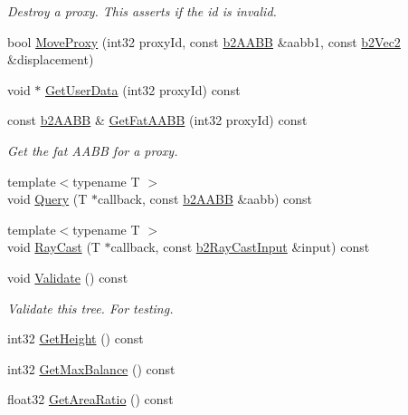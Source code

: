 \begin{DoxyCompactItemize}
\begin{DoxyCompactList}\small\item\em Destroy a proxy. This asserts if the id is invalid. \end{DoxyCompactList}\item 
bool \hyperlink{classb2_dynamic_tree_a7748252811f3c575015931399cbe4daa}{Move\+Proxy} (int32 proxy\+Id, const \hyperlink{structb2_a_a_b_b}{b2\+A\+A\+BB} \&aabb1, const \hyperlink{structb2_vec2}{b2\+Vec2} \&displacement)
\item 
void $\ast$ \hyperlink{classb2_dynamic_tree_a44ab57dce3c42b0a5847a64e489a71ce}{Get\+User\+Data} (int32 proxy\+Id) const 
\item 
const \hyperlink{structb2_a_a_b_b}{b2\+A\+A\+BB} \& \hyperlink{classb2_dynamic_tree_adf4676b1c34a57b4451bcbeaebe65687}{Get\+Fat\+A\+A\+BB} (int32 proxy\+Id) const \hypertarget{classb2_dynamic_tree_adf4676b1c34a57b4451bcbeaebe65687}{}\label{classb2_dynamic_tree_adf4676b1c34a57b4451bcbeaebe65687}

\begin{DoxyCompactList}\small\item\em Get the fat A\+A\+BB for a proxy. \end{DoxyCompactList}\item 
{\footnotesize template$<$typename T $>$ }\\void \hyperlink{classb2_dynamic_tree_adf70aee89b4692fc79d65b1f54308585}{Query} (T $\ast$callback, const \hyperlink{structb2_a_a_b_b}{b2\+A\+A\+BB} \&aabb) const 
\item 
{\footnotesize template$<$typename T $>$ }\\void \hyperlink{classb2_dynamic_tree_abd7a5c6a5bc109dbbdb0ec3aae039648}{Ray\+Cast} (T $\ast$callback, const \hyperlink{structb2_ray_cast_input}{b2\+Ray\+Cast\+Input} \&input) const 
\item 
void \hyperlink{classb2_dynamic_tree_abfac96c615b08406cba3e53b39800f1c}{Validate} () const \hypertarget{classb2_dynamic_tree_abfac96c615b08406cba3e53b39800f1c}{}\label{classb2_dynamic_tree_abfac96c615b08406cba3e53b39800f1c}

\begin{DoxyCompactList}\small\item\em Validate this tree. For testing. \end{DoxyCompactList}\item 
int32 \hyperlink{classb2_dynamic_tree_add7e09cdf279e7c0031da9dfd4cdf4db}{Get\+Height} () const 
\item 
int32 \hyperlink{classb2_dynamic_tree_ae02c45d1a68b42e59d170438ddbb7977}{Get\+Max\+Balance} () const 
\item 
float32 \hyperlink{classb2_dynamic_tree_ad78282a720c451e032b43c34cba02f1a}{Get\+Area\+Ratio} () const \hypertarget{classb2_dynamic_tree_ad78282a720c451e032b43c34cba02f1a}{}\label{classb2_dynamic_tree_ad78282a720c451e032b43c34cba02f1a}


\end{DoxyCompactItemize}
